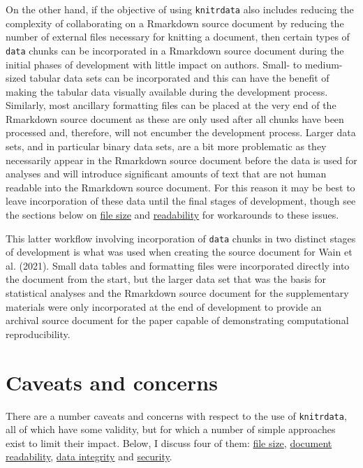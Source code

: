 On the other hand, if the objective of using \texttt{knitrdata} also includes reducing the complexity of collaborating on a Rmarkdown source document by reducing the number of external files necessary for knitting a document, then certain types of \texttt{data} chunks can be incorporated in a Rmarkdown source document during the initial phases of development with little impact on authors. Small- to medium-sized tabular data sets can be incorporated and this can have the benefit of making the tabular data visually available during the development process. Similarly, most ancillary formatting files can be placed at the very end of the Rmarkdown source document as these are only used after all chunks have been processed and, therefore, will not encumber the development process. Larger data sets, and in particular binary data sets, are a bit more problematic as they necessarily appear in the Rmarkdown source document before the data is used for analyses and will introduce significant amounts of text that are not human readable into the Rmarkdown source document. For this reason it may be best to leave incorporation of these data until the final stages of development, though see the sections below on \protect\hyperlink{filesize}{file size} and \protect\hyperlink{readable}{readability} for workarounds to these issues.

This latter workflow involving incorporation of \texttt{data} chunks in two distinct stages of development is what was used when creating the source document for Wain et al. (2021). Small data tables and formatting files were incorporated directly into the document from the start, but the larger data set that was the basis for statistical analyses and the Rmarkdown source document for the supplementary materials were only incorporated at the end of development to provide an archival source document for the paper capable of demonstrating computational reproducibility.

\hypertarget{caveats-and-concerns}{%
\section{Caveats and concerns}\label{caveats-and-concerns}}

There are a number caveats and concerns with respect to the use of \texttt{knitrdata}, all of which have some validity, but for which a number of simple approaches exist to limit their impact. Below, I discuss four of them: \protect\hyperlink{filesize}{file size}, \protect\hyperlink{readable}{document readability}, \protect\hyperlink{integrity}{data integrity} and \protect\hyperlink{security}{security}.


